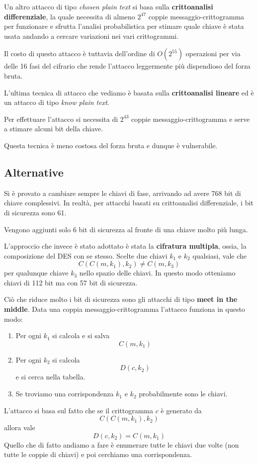 Un altro attacco di tipo \emph{chosen plain text} si basa sulla \textbf{crittoanalisi differenziale}, la quale necessita
di almeno $2^{47}$ coppie messaggio-crittogramma per funzionare e sfrutta l'analisi probabilistica per stimare quale
chiave \`e stata usata andando a cercare variazioni nei vari crittogrammi.

Il costo di questo attacco \`e tuttavia dell'ordine di $O(2^{55})$ operazioni per via delle 16 fasi del cifrario che
rende l'attacco leggermente pi\`u dispendioso del forza bruta.

L'ultima tecnica di attacco che vediamo \`e basata sulla \textbf{crittoanalisi lineare} ed \`e un attacco di tipo
\emph{know plain text}.

Per effettuare l'attacco si necessita di $2^{43}$ coppie messaggio-crittogramma e serve a stimare alcuni bit della chiave.

Questa tecnica \`e meno costosa del forza bruta e dunque \`e vulnerabile.

\subsection{Alternative}\label{alternative_DES}
Si \`e provato a cambiare sempre le chiavi di fase, arrivando ad avere 768 bit di chiave complessivi. In realt\`a,
per attacchi basati su crittoanalisi differenziale, i bit di sicurezza sono 61.

Vengono aggiunti solo 6 bit di sicurezza al fronte di una chiave molto pi\`u lunga.

L'approccio che invece \`e stato adottato \`e stata la \textbf{cifratura multipla}, ossia, la composizione del DES con
se stesso. Scelte due chiavi $k_1$ e $k_2$ qualsiasi, vale che
\[ C(C(m, k_1), k_2) \neq C(m, k_3) \]
per qualunque chiave $k_3$ nello spazio delle chiavi. In questo modo otteniamo chiavi di 112 bit ma con 57 bit di
sicurezza.

Ci\`o che riduce molto i bit di sicurezza sono gli attacchi di tipo \textbf{meet in the middle}. Data una coppia
messaggio-crittogramma l'attacco funziona in questo modo:
\begin{enumerate}
	\item Per ogni $k_1$ si calcola e si salva
	      \[ C(m, k_1) \]
	\item Per ogni $k_2$ si calcola
	      \[ D(c, k_2) \]
	      e si cerca nella tabella.
	\item Se troviamo una corrispondenza $k_1$ e $k_2$ probabilmente sono le chiavi.
\end{enumerate}
L'attacco si basa sul fatto che se il crittogramma $c$ \`e generato da
\[ C(C(m, k_1), k_2) \]
allora vale
\[ D(c, k_2) = C(m, k_1) \]
Quello che di fatto andiamo a fare \`e enumerare tutte le chiavi due volte (non tutte le coppie di chiavi) e poi cerchiamo
una corrispondenza.

